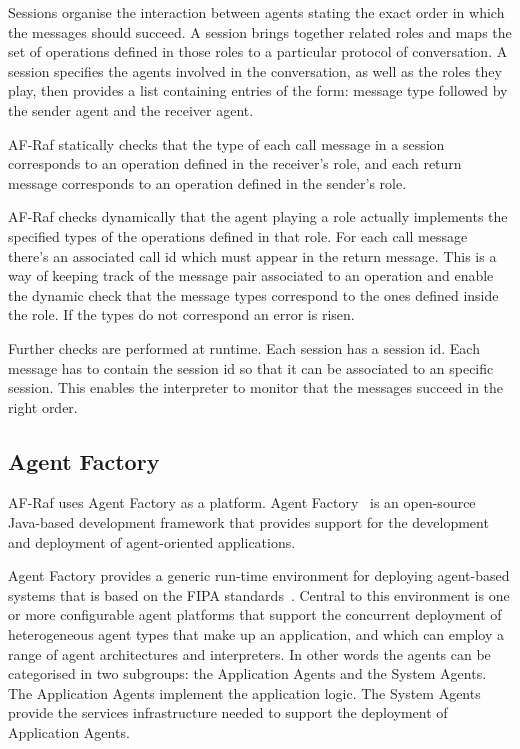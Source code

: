 \documentclass[a4paper,12pt,oneside,fleqn]{book} %
\begin{document}
Sessions organise the interaction between agents stating the exact order in
which the messages should succeed. A session brings together related roles
and maps the set of operations defined in those roles to a particular
protocol of conversation. A session specifies the agents involved in the
conversation, as well as the roles they play, then provides a list
containing entries of the form: message type followed by the sender agent
and the receiver agent.

AF-Raf statically checks that the type of each call message in a session
corresponds to an operation defined in the receiver's role, and each return
message corresponds to an operation defined in the sender's role.

AF-Raf checks dynamically that the agent playing a role actually implements
the specified types of the operations defined in that role.  For each call
message there's an associated call id which must appear in the return
message. This is a way of keeping track of the message pair associated to
an operation and enable the dynamic check that the message types correspond
to the ones defined inside the role. If the types do not correspond an
error is risen.

Further checks are performed at runtime. Each session has a session id.
Each message has to contain the session id so that it can be associated to
an specific session. This enables the interpreter to monitor that the
messages succeed in the right order.

\subsection{Agent Factory} %

AF-Raf uses Agent Factory as a platform. Agent
Factory~\cite{collier2002agent} is an open-source Java-based development
framework that provides support for the development and deployment of
agent-oriented applications.

Agent Factory provides a generic run-time environment for deploying
agent-based systems that is based on the FIPA
standards~\cite{poslad2000fipa}.  Central to this environment is one or
more configurable agent platforms that support the concurrent deployment of
heterogeneous agent types that make up an application, and which can employ
a range of agent architectures and interpreters. In other words the agents
can be categorised in two subgroups: the Application Agents and the System
Agents. The Application Agents implement the application logic. The System
Agents provide the services infrastructure needed to support the deployment
of Application Agents.
\end{document}
